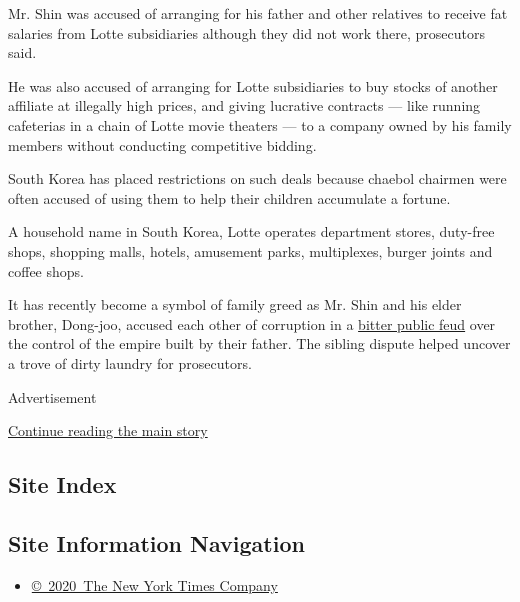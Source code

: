 Mr. Shin was accused of arranging for his father and other relatives to
receive fat salaries from Lotte subsidiaries although they did not work
there, prosecutors said.

He was also accused of arranging for Lotte subsidiaries to buy stocks of
another affiliate at illegally high prices, and giving lucrative
contracts --- like running cafeterias in a chain of Lotte movie theaters
--- to a company owned by his family members without conducting
competitive bidding.

South Korea has placed restrictions on such deals because chaebol
chairmen were often accused of using them to help their children
accumulate a fortune.

A household name in South Korea, Lotte operates department stores,
duty-free shops, shopping malls, hotels, amusement parks, multiplexes,
burger joints and coffee shops.

It has recently become a symbol of family greed as Mr. Shin and his
elder brother, Dong-joo, accused each other of corruption in a
\href{http://www.nytimes3xbfgragh.onion/2015/09/23/business/international/south-korean-chaebol-drama-lotte.html}{bitter
public feud} over the control of the empire built by their father. The
sibling dispute helped uncover a trove of dirty laundry for prosecutors.

Advertisement

\protect\hyperlink{after-bottom}{Continue reading the main story}

\hypertarget{site-index}{%
\subsection{Site Index}\label{site-index}}

\hypertarget{site-information-navigation}{%
\subsection{Site Information
Navigation}\label{site-information-navigation}}

\begin{itemize}
\tightlist
\item
  \href{https://help.nytimes3xbfgragh.onion/hc/en-us/articles/115014792127-Copyright-notice}{©~2020~The
  New York Times Company}
\end{itemize}

